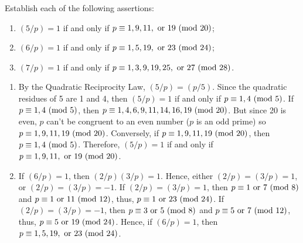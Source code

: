 \begin{exercise}
    Establish each of the following assertions:
    \begin{enumerate}
        \item $(5/p) = 1$ if and only if $p \equiv 1,9,11, \text{ or } 19 \ (\mathrm{mod}\ 20)$;
        \item $(6/p) = 1$ if and only if $p \equiv 1,5,19, \text{ or } 23 \ (\mathrm{mod}\ 24)$;
        \item $(7/p) = 1$ if and only if $p \equiv 1,3,9,19,25, \text{ or } 27 \ (\mathrm{mod}\ 28)$. \\
    \end{enumerate}
\end{exercise}

\begin{solution}
    \begin{enumerate}
        \item By the Quadratic Reciprocity Law, $(5/p) = (p/5)$. Since the quadratic residues of 5 are 1 and 4, then $(5/p) = 1$ if and only if $p \equiv 1,4 \ (\mathrm{mod}\ 5)$. If $p \equiv 1,4 \ (\mathrm{mod}\ 5)$, then $p \equiv 1,4,6,9,11,14,16, 19 \ (\mathrm{mod}\ 20)$. But since 20 is even, $p$ can't be congruent to an even number ($p$ is an odd prime) so $p \equiv 1,9,11,19 \ (\mathrm{mod}\ 20)$. Conversely, if $p \equiv 1,9,11,19 \ (\mathrm{mod}\ 20)$, then $p \equiv 1,4 \ (\mathrm{mod}\ 5)$. Therefore, $(5/p) = 1$ if and only if $p \equiv 1,9,11, \text{ or } 19 \ (\mathrm{mod}\ 20)$. 
        \item If $(6/p) = 1$, then $(2/p)(3/p) = 1$. Hence, either $(2/p) = (3/p) = 1$, or $(2/p) = (3/p) = -1$. If $(2/p) = (3/p) = 1$, then $p \equiv 1 \text{ or }7 \ (\mathrm{mod}\ 8)$ and $p \equiv 1 \text{ or } 11 \ (\mathrm{mod}\ 12)$, thus, $p \equiv 1 \text{ or } 23 \ (\mathrm{mod}\ 24)$. If $(2/p) = (3/p) = -1$, then $p \equiv 3 \text{ or }5 \ (\mathrm{mod}\ 8)$ and $p \equiv 5 \text{ or } 7 \ (\mathrm{mod}\ 12)$, thus, $p \equiv 5\text{ or } 19 \ (\mathrm{mod}\ 24)$. Hence, if $(6/p) = 1$, then $p \equiv 1,5,19, \text{ or } 23 \ (\mathrm{mod}\ 24)$.\\
        

\end{enumerate}
\end{solution}
